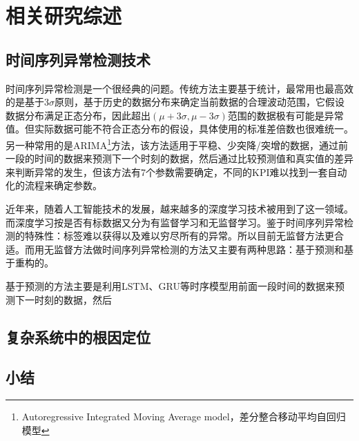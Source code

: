 
\chapter{相关研究综述}
\label{cha:intro}
\section{时间序列异常检测技术}
时间序列异常检测是一个很经典的问题。传统方法主要基于统计，最常用也最高效的是基于3$\sigma$原则，基于历史的数据分布来确定当前数据的合理波动范围，它假设数据分布满足正态分布，因此超出$(\mu + 3\sigma,\mu-3\sigma)$范围的数据极有可能是异常值。但实际数据可能不符合正态分布的假设，具体使用的标准差倍数也很难统一。另一种常用的是ARIMA\footnote{Autoregressive Integrated Moving Average model，差分整合移动平均自回归模型}方法，该方法适用于平稳、少突降/突增的数据，通过前一段的时间的数据来预测下一个时刻的数据，然后通过比较预测值和真实值的差异来判断异常的发生，但该方法有7个参数需要确定，不同的KPI难以找到一套自动化的流程来确定参数。

近年来，随着人工智能技术的发展，越来越多的深度学习技术被用到了这一领域。而深度学习按是否有标数据又分为有监督学习和无监督学习。鉴于时间序列异常检测的特殊性：标签难以获得以及难以穷尽所有的异常。所以目前无监督方法更合适。而用无监督方法做时间序列异常检测的方法又主要有两种思路：基于预测和基于重构的。

基于预测的方法主要是利用LSTM、GRU等时序模型用前面一段时间的数据来预测下一时刻的数据，然后

\section{复杂系统中的根因定位}
\section{小结}

